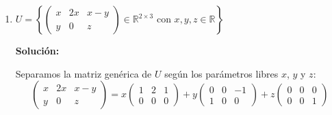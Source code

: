\documentclass[12pt]{article}
\newcommand{\solucion}{%
    \vspace{0.8em}%
    \textbf{Solución:}%
    \vspace{0.8em}%
}
\begin{document}
\begin{enumerate}[label=\alph*.-]
    Estas seis matrices son linealmente independientes, pues cada una tiene su entrada distintiva de $1$ en una posición donde todas las demás valen $0$ (la única forma de anular la combinación es que cada coeficiente sea cero).

    \textbf{Conclusión:}
    \[
    \text{Base de } T = \left\{ \begin{pmatrix}1&0&0\\0&0&0\\0&0&0\end{pmatrix}, \begin{pmatrix}0&1&0\\0&0&0\\0&0&0\end{pmatrix}, \begin{pmatrix}0&0&1\\0&0&0\\0&0&0\end{pmatrix}, \begin{pmatrix}0&0&0\\0&1&0\\0&0&0\end{pmatrix}, \begin{pmatrix}0&0&0\\0&0&1\\0&0&0\end{pmatrix}, \begin{pmatrix}0&0&0\\0&0&0\\0&0&1\end{pmatrix} \right\}
    \]
    \[
    \dim(T) = 6.
    \]

    \item $U = \left\{ \begin{pmatrix} x & 2x & x-y \\ y & 0 & z \end{pmatrix} \in \mathbb{R}^{2\times3} \text{ con } x,y,z \in \mathbb{R} \right\}$

    \solucion

    Separamos la matriz genérica de $U$ según los parámetros libres $x$, $y$ y $z$:
    \[
    \begin{pmatrix} x & 2x & x-y \\ y & 0 & z \end{pmatrix}
    = x\begin{pmatrix}1&2&1\\0&0&0\end{pmatrix} + y\begin{pmatrix}0&0&-1\\1&0&0\end{pmatrix} + z\begin{pmatrix}0&0&0\\0&0&1\end{pmatrix}
    \]


\end{enumerate}
\end{document}
